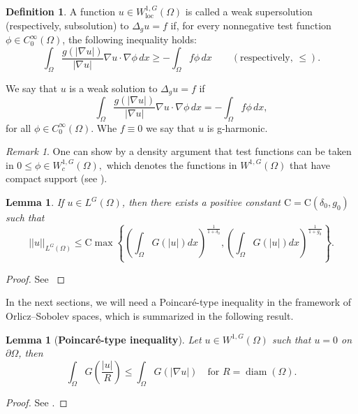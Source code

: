 \documentclass[11pt, leqno]{article}
\newtheorem{lemma}[theorem]{Lemma}
\theoremstyle{definition}
\newtheorem{definition}[theorem]{Definition}
\theoremstyle{remark}
\newtheorem{remark}[theorem]{Remark}
\numberwithin{equation}{section}
\begin{document}
\begin{definition}
A function $u\in W^{1,G}_{\mathrm{loc}}(\Omega)$ is called a weak supersolution
(respectively, subsolution) to $\Delta_gu=f$ if, for every nonnegative test
function $\phi\in C_0^\infty(\Omega)$, the following inequality holds:
\begin{equation}\label{test}
\int_\Omega \frac{g(|\nabla u|)}{|\nabla u|}\nabla u\cdot \nabla\phi\,dx
\geq
-\int_\Omega f\phi\,dx
\qquad
(\text{respectively, } \leq).
\end{equation}

We say that $u$ is a weak solution to $\Delta_gu=f$ if
\[
\int_\Omega \frac{g(|\nabla u|)}{|\nabla u|}\nabla u\cdot \nabla\phi\,dx
=
-\int_\Omega f\phi\,dx,
\]
for all $\phi\in C_0^\infty(\Omega)$. Whe $f\equiv0$ we say that $u$ is g-harmonic.
\end{definition}

\begin{remark}
    One can show by a density argument that test functions can be taken in $0\leq \phi\in W^{1,G}_c(\Omega),$ which denotes the functions in $W^{1,G}(\Omega)$ that have compact support (see \cite{BraMorei,HarHas19}).
\end{remark}





\begin{lemma}\label{behaviornorm}
If \(u\in L^{G}(\Omega)\), then there exists a positive constant \(\mathrm{C}=\mathrm{C}(\delta_{0},g_{0})\) such that 
\[
||u||_{L^G(\Omega)}\leq \mathrm{C}\max\left\{\left(\int_{\Omega}{G}(|u|)dx\right)^{\frac{1}{1+\delta_{0}}},\left(\int_{\Omega}{G}(|u|)dx\right)^{\frac{1}{1+g_{0}}}\right\}.
\]
\end{lemma}
\begin{proof}
See \cite[Lemma 2.3]{MarWol08}
\end{proof}

In the next sections, we will need a Poincar\'e-type inequality in the framework of Orlicz--Sobolev spaces, which is summarized in the following result.
\begin{lemma}[\bf Poincar\'e-type inequality]\label{poincareinequality}
Let \(u\in W^{1,G}(\Omega)\) such that \(u=0\) on \(\partial \Omega\), then
\[
\int_{\Omega}{G}\left(\frac{|u|}{R}\right)\leq \int_{\Omega}G(|\nabla u|)\quad \text{for}\,\, R=\operatorname{diam}(\Omega).
\]
\end{lemma}
\begin{proof}
See \cite[Lemma 2.4]{MarWol08}.
\end{proof}
\end{document}
